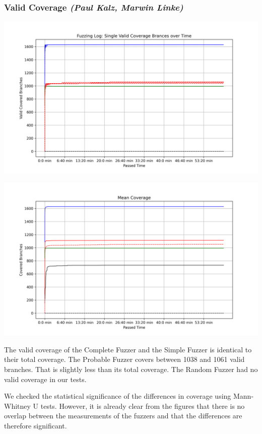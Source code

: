 \documentclass[runningheads]{llncs}
\begin{document}
\subsubsection{Valid Coverage \normalfont\textit{(Paul Kalz, Marwin Linke)}}
\begin{center}
\includegraphics[width=\textwidth]{img/valid_coverage}
\label{fig3}
\end{center}

\begin{center}
\includegraphics[width=\textwidth]{img/average_coverage}
\label{fig4}
\end{center}
The valid coverage of the Complete Fuzzer and the Simple Fuzzer is identical to their total coverage. The Probable Fuzzer covers between 1038 and 1061 valid branches. That is slightly less than its total coverage. The Random Fuzzer had no valid coverage in our tests.

We checked the statistical significance of the differences in coverage using Mann-Whitney U tests. However, it is already clear from the figures that there is no overlap between the measurements of the fuzzers and that the differences are therefore significant.
\end{document}
